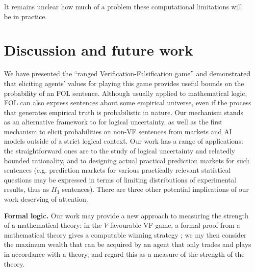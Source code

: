 It remains unclear how much of a problem these computational limitations will be in practice.

\section{Discussion and future work}
\label{nonvf:sec:conclusion}

We have presented the ``ranged Verification-Falsification game'' and demonstrated that eliciting agents' values for playing this game provides useful bounds on the probability of an FOL sentence. Although usually applied to mathematical logic, FOL can also express sentences about some empirical universe, even if the process that generates empirical truth is probabilistic in nature. Our mechanism stands as an alternative framework to \citet{garrabrantLogicalInduction2020} for logical uncertainty, as well as the first mechanism to elicit probabilities on non-VF sentences from markets and AI models outside of a strict logical context. %
Our work has a range of applications: the straightforward ones are to the study of logical uncertainty and relatedly bounded rationality, and to designing actual practical prediction markets for such sentences (e.g. prediction markets for various practically relevant statistical questions may be expressed in terms of limiting distributions of experimental results, thus as $\Pi_3$ sentences). There are three other potential implications of our work deserving of attention.

\textbf{Formal logic.} Our work may provide a new approach to measuring the strength of a mathematical theory: in the $V$-favourable VF game, a formal proof from a mathematical theory gives a computable winning strategy \citep{bonnayPreuvesJeuxSemantiques2004, boyerProofTruth2012}; we my then consider the maximum wealth that can be acquired by an agent that only trades and plays in accordance with a theory, and regard this as a measure of the strength of the theory.

